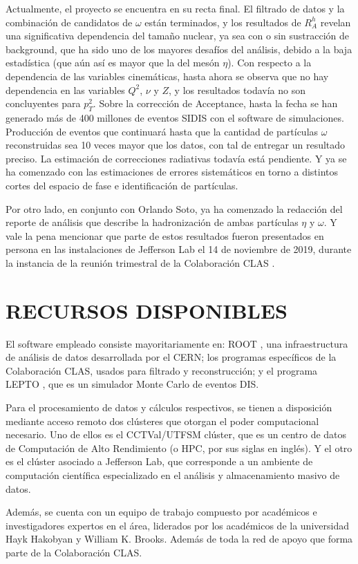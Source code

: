 Actualmente, el proyecto se encuentra en su recta final. El filtrado de datos y la combinación de candidatos de $\omega$ están terminados, y los resultados de $R^h_A$ revelan una significativa dependencia del tamaño nuclear, ya sea con o sin sustracción de background, que ha sido uno de los mayores desafíos del análisis, debido a la baja estadística (que aún así es mayor que la del mesón $\eta$). Con respecto a la dependencia de las variables cinemáticas, hasta ahora se observa que no hay dependencia en las variables $Q^2$, $\nu$ y $Z$, y los resultados todavía no son concluyentes para $p_T^2$. Sobre la corrección de Acceptance, hasta la fecha se han generado más de 400 millones de eventos SIDIS con el software de simulaciones. Producción de eventos que continuará hasta que la cantidad de partículas $\omega$ reconstruidas sea 10 veces mayor que los datos, con tal de entregar un resultado preciso. La estimación de correcciones radiativas todavía está pendiente. Y ya se ha comenzado con las estimaciones de errores sistemáticos en torno a distintos cortes del espacio de fase e identificación de partículas.

Por otro lado, en conjunto con Orlando Soto, ya ha comenzado la redacción del reporte de análisis que describe la hadronización de ambas partículas $\eta$ y $\omega$. Y vale la pena mencionar que parte de estos resultados fueron presentados en persona en las instalaciones de Jefferson Lab el 14 de noviembre de 2019, durante la instancia de la reunión trimestral de la Colaboración CLAS \cite{pres}.

\section{RECURSOS DISPONIBLES}

El software empleado consiste mayoritariamente en: ROOT \cite{root}, una infraestructura de análisis de datos desarrollada por el CERN; los programas específicos de la Colaboración CLAS, usados para filtrado y reconstrucción; y el programa LEPTO \cite{lepto}, que es un simulador Monte Carlo de eventos DIS.

Para el procesamiento de datos y cálculos respectivos, se tienen a disposición mediante acceso remoto dos clústeres que otorgan el poder computacional necesario. Uno de ellos es el CCTVal/UTFSM clúster, que es un centro de datos de Computación de Alto Rendimiento (o HPC, por sus siglas en inglés). Y el otro es el clúster asociado a Jefferson Lab, que corresponde a un ambiente de computación científica especializado en el análisis y almacenamiento masivo de datos.

Además, se cuenta con un equipo de trabajo compuesto por académicos e investigadores expertos en el área, liderados por los académicos de la universidad Hayk Hakobyan y William K. Brooks. Además de toda la red de apoyo que forma parte de la Colaboración CLAS.

